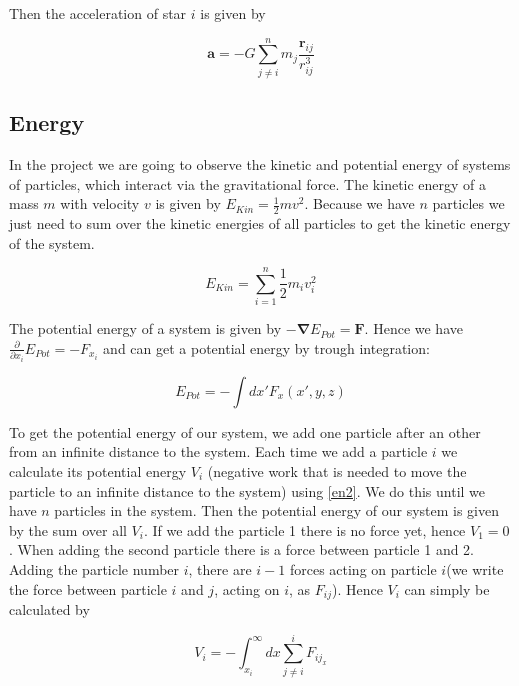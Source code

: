 \documentclass[10pt,a4paper]{article}
\begin{document}
Then the acceleration of star $i$ is given by

\begin{equation}	
\label{eq:gra3}
\mathbf{a} = - G \sum_{j \neq i}^{n} m_j \frac{\mathbf{r}_{ij}}{r_{ij}^3}
\end{equation}

\subsection{Energy}

In the project we are going to observe the kinetic and potential energy of systems of particles, which interact via the gravitational force. The kinetic energy of a mass $m$ with velocity $v$ is given by $E_{Kin} = \frac{1}{2} m v^2$. Because we have $n$ particles we just need to sum over the kinetic energies of all particles to get the kinetic energy of the system.

\begin{equation}	
\label{en1}
E_{Kin} = \sum_{i = 1}^{n} \frac{1}{2} m_i v_i^2
\end{equation}

The potential energy of a system is given by $- \mathbf{\nabla} E_{Pot} = \mathbf{F}$. Hence we have $\frac{\partial}{\partial x_i}E_{Pot} =- F_{x_i}$ and can get a potential energy by trough integration:

\begin{equation}
\label{en2}
	E_{Pot} = - \int dx' F_{x}(x', y ,z)
\end{equation}

To get the potential energy of our system, we add one particle after an other from an infinite distance to the system. Each time we add a particle $i$ we calculate its potential energy $V_i$ (negative work that is needed to move the particle to an infinite distance to the system) using \eqref{en2}. We do this until we have $n$ particles in the system. Then the potential energy of our system is given by the sum over all $V_i$. If we add the particle 1 there is no force yet, hence $V_1 = 0$. When adding the second particle there is a force between particle 1 and 2. Adding the particle number $i$, there are $i-1$ forces acting on particle $i$(we write the force between particle $i$ and $j$, acting on $i$, as $F_{ij}$). Hence $V_i$ can simply be calculated by

\begin{equation}
\label{en3}
	V_i = - \int_{x_i}^{\infty} dx \sum_{j \neq i}^{i} F_{ij_x}
\end{equation}
\end{document}
